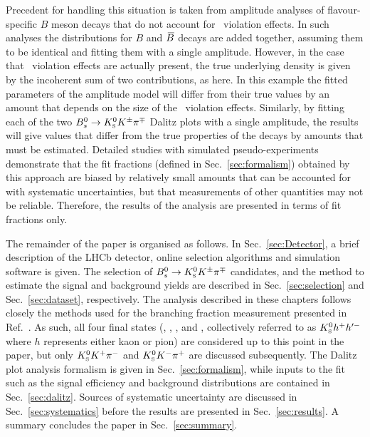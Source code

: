 Precedent for handling this situation is taken from amplitude analyses of flavour-specific $B$ meson decays that do not account for \CP\ violation effects.  
In such analyses the distributions for $B$ and ${\kern 0.18em\overline{\kern -0.18em B}{}}$ decays are added together, assuming them to be identical and fitting them with a single amplitude.
However, in the case that \CP\ violation effects are actually present, the true underlying density is given by the incoherent sum of two contributions, as here.  
In this example the fitted parameters of the amplitude model will differ from their true values by an amount that depends on the size of the \CP\ violation effects.
Similarly, by fitting each of the two ${{B}^0_{s}}\rightarrow{\ensuremath{{K}^0_{\mathrm{ \scriptscriptstyle S}}}}{\ensuremath{{K}^\pm}}{\ensuremath{{\pi}^\mp}}$ Dalitz plots with a single amplitude, the results will give values that differ from the true properties of the decays by amounts that must be estimated.
Detailed studies with simulated pseudo-experiments demonstrate that the fit fractions (defined in Sec.~\ref{sec:formalism}) obtained by this approach are biased by relatively small amounts that can be accounted for with systematic uncertainties, but that measurements of other quantities may not be reliable.
Therefore, the results of the analysis are presented in terms of fit fractions only.

The remainder of the paper is organised as follows.
In Sec.~\ref{sec:Detector}, a brief description of the LHCb detector, online selection algorithms and simulation software is given.
The selection of ${{B}^0_{s}}\rightarrow{\ensuremath{{K}^0_{\mathrm{ \scriptscriptstyle S}}}}{\ensuremath{{K}^\pm}}{\ensuremath{{\pi}^\mp}}$ candidates, and the method to estimate the signal and background yields are described in Sec.~\ref{sec:selection} and Sec.~\ref{sec:dataset}, respectively.
The analysis described in these chapters follows closely the methods used for the branching fraction measurement presented in Ref.~\cite{LHCb-PAPER-2017-010}.
As such, all four final states (\KsPiPi, \KsKpPim, \KsKmPip, and \KsKK, collectively referred to as ${{K}^0_{\mathrm{ \scriptscriptstyle S}}} h^+ h^{\prime-}$ where $h$ represents either kaon or pion) are considered up to this point in the paper, but only ${{K}^0_{\mathrm{ \scriptscriptstyle S}}} {{K}^+} {{\pi}^-}$ and ${{K}^0_{\mathrm{ \scriptscriptstyle S}}} {{K}^-} {{\pi}^+}$ are discussed subsequently.
The Dalitz plot analysis formalism is given in Sec.~\ref{sec:formalism}, while inputs to the fit such as the signal efficiency and background distributions are contained in Sec.~\ref{sec:dalitz}.
Sources of systematic uncertainty are discussed in Sec.~\ref{sec:systematics} before the results are presented in Sec.~\ref{sec:results}.
A summary concludes the paper in Sec.~\ref{sec:summary}.

